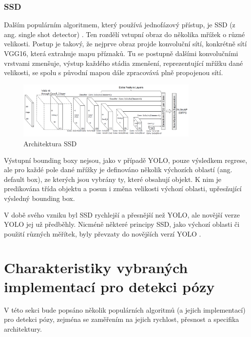 \subsubsection*{SSD}
Dalším populárním algoritmem, který používá jednofázový přístup, je SSD (z ang.
single shot detector) \cite{szegedy:ssd}. Ten rozdělí vstupní obraz do několika
mřížek o různé velikosti. Postup je takový, že nejprve obraz projde konvoluční
sítí, konkrétně sítí VGG16, která extrahuje mapu příznaků. Tu se postupně
dalšími konvolučními vrstvami zmenšuje, výstup každého stádia zmenšení,
reprezentující mřížku dané velikosti, se spolu s původní mapou dále zpracovává
plně propojenou sítí.
\begin{figure}[]
    \centering
    \includegraphics[width=0.8\textwidth]{Figures/ssd.png}
    \caption{Architektura SSD \cite{szegedy:ssd}}
    \label{fig:ssd}
\end{figure}

Výstupní bounding boxy nejsou, jako v případě YOLO, pouze výsledkem regrese,
ale pro každé pole dané mřížky je definováno několik výchozích oblastí (ang.
default box), ze kterých jsou vybrány ty, které obsahují objekt. K nim je
predikována třída objektu a posun i změna velikosti výchozí oblasti,
upřesňující výsledný bounding box.

V době svého vzniku byl SSD rychlejší a přesnější než YOLO, ale novější verze
YOLO jej už předběhly. Nicméně některé principy SSD, jako výchozí oblasti či
použití různých měřítek, byly převzaty do novějších verzí YOLO \cite{szegedy:ssd}.

\section{Charakteristiky vybraných implementací pro detekci pózy}

V této sekci bude popsáno několik populárních algoritmů (a jejich implementací)
pro detekci pózy, zejména se zaměřením na jejich rychlost, přesnost a specifika
architektury.

